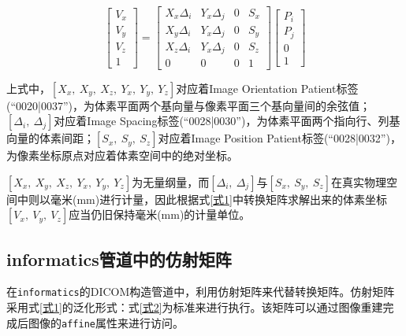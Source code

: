 \documentclass{ctexart}
\begin{document}
\begin{equation}\label{式1}
\left[\begin{array}{c}
V_x \\
V_y \\
V_z \\
1
\end{array}\right] = 
\left[\begin{array}{cccc}
X_x \Delta_i & Y_x \Delta_j & 0 & S_x\\
X_y \Delta_i & Y_x \Delta_j & 0 & S_y\\
X_z \Delta_i & Y_x \Delta_j & 0 & S_z\\
0 & 0 & 0 & 1
\end{array}\right]
\left[\begin{array}{c}
P_i \\
P_j \\
0 \\
1
\end{array}\right]
\end{equation}

上式中，$[X_x,\ X_y,\ X_z,\ Y_x,\ Y_y,\ Y_z]$对应着Image Orientation Patient标签(``0020|0037'')，为体素平面两个基向量与像素平面三个基向量间的余弦值；$[\Delta_i,\ \Delta_j]$对应着Image Spacing标签(``0028|0030'')，为体素平面两个指向行、列基向量的体素间距；$[S_x,\ S_y,\ S_z]$对应着Image Position Patient标签(``0028|0032'')，为像素坐标原点对应着体素空间中的绝对坐标。\par

$[X_x,\ X_y,\ X_z,\ Y_x,\ Y_y,\ Y_z]$为无量纲量，而$[\Delta_i,\ \Delta_j]$与$[S_x,\ S_y,\ S_z]$在真实物理空间中则以毫米(mm)进行计量，因此根据式\ref{式1}中转换矩阵求解出来的体素坐标$[V_x,\ V_y,\ V_z]$应当仍旧保持毫米(mm)的计量单位。\par

\subsection{informatics管道中的仿射矩阵}

在\verb|informatics|的DICOM构造管道中，利用仿射矩阵来代替转换矩阵。仿射矩阵采用式\ref{式1}的泛化形式：式\ref{式2}为标准来进行执行。该矩阵可以通过图像重建完成后图像的\verb|affine|属性来进行访问。\par
\end{document}
